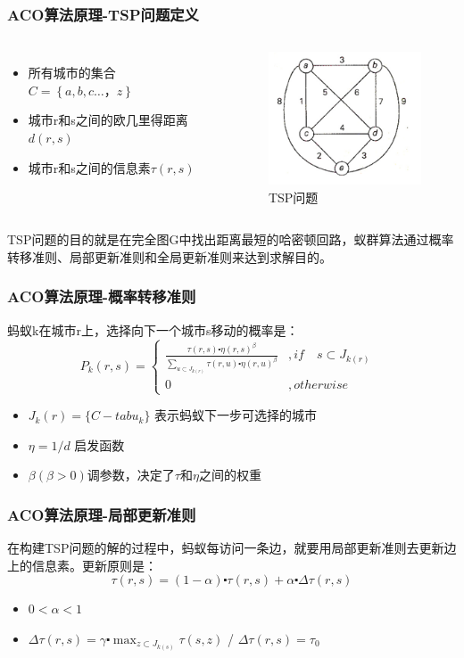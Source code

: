 \begin{frame}
	\frametitle{ACO算法原理-TSP问题定义}
	\begin{columns}
		\begin{itemize}
			\item{所有城市的集合$C=\left\{ a,b,c…，z \right\}$}
			\item{城市r和s之间的欧几里得距离$d(r,s)$}
			\item{城市r和s之间的信息素$\tau(r,s)$}
		\end{itemize}
		\begin{figure}[htbp]
			\centering
			\includegraphics[width=5cm]{pic/ant2.png}
			\caption{TSP问题}
		\end{figure}
	\end{columns}
	TSP问题的目的就是在完全图G中找出距离最短的哈密顿回路，蚁群算法通过概率转移准则、局部更新准则和全局更新准则来达到求解目的。
\end{frame}


\begin{frame}
	\frametitle{ACO算法原理-概率转移准则}
	蚂蚁k在城市r上，选择向下一个城市s移动的概率是：
	\Large{
	$$
	P_k(r,s) =
		\begin{cases}
		\frac{\tau (r,s) \centerdot \eta (r,s)^\beta}{\sum_{u \subset J_{k(r)}} \tau (r,u)\centerdot \eta (r,u)^\beta}  & \text{$,if\quad s \subset J_{k(r)}$ } \\
		0 & \text{$,otherwise$}
		\end{cases}
	$$}
	\normalsize{
	\begin{itemize}
			\item{$J_k(r) = \{ C-tabu_k \}$ 表示蚂蚁下一步可选择的城市}
			\item{$\eta = 1/d$ 启发函数}
			\item{$\beta(\beta>0)$调参数，决定了$\tau$和$\eta$之间的权重}
		\end{itemize}
	}
\end{frame}


\begin{frame}
	\frametitle{ACO算法原理-局部更新准则}
	在构建TSP问题的解的过程中，蚂蚁每访问一条边，就要用局部更新准则去更新边上的信息素。更新原则是：
	\Large{$$\tau(r,s) = (1-\alpha)\centerdot\tau(r,s)+\alpha\centerdot\Delta\tau(r,s)$$}
	\begin{itemize}
			\item{$0<\alpha<1$ }
			\item{$\Delta\tau(r,s) = \gamma\centerdot\max_{z\subset J_{k(s)}}\tau(s,z)$ /
					$\Delta\tau(r,s) = \tau_0$}
		\end{itemize}
\end{frame}



